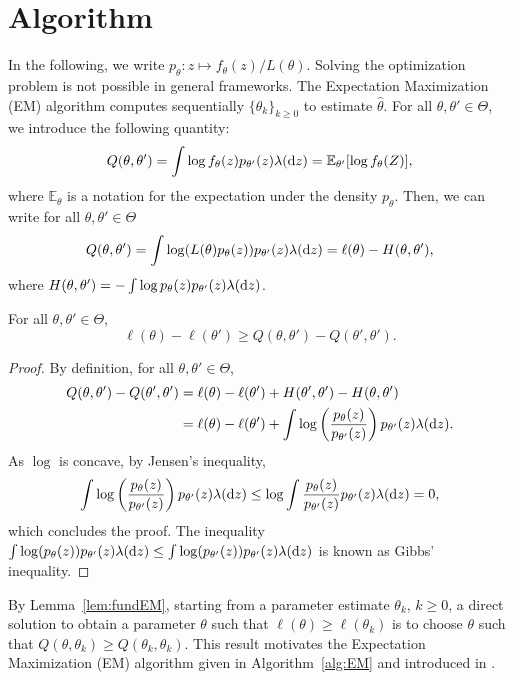 \documentclass[english,graybox,envcountchap,envcountsame,sectrefs,shortlabels]{svmono}
\theoremstyle{style}
\newcommand{\eqsp}{}
\begin{document}
\section{Algorithm}
In the following, we write $p_\theta:z\mapsto f_\theta(z)/L(\theta)$. Solving the optimization problem is not possible in general frameworks. The Expectation Maximization (EM) algorithm computes sequentially $\{\theta_k\}_{k\geq 0}$ to estimate $\widehat \theta$. For all $\theta,\theta'\in\Theta$, we introduce the following quantity:
$$
Q(\theta,\theta') = \int \log f_\theta(z)p_{\theta'}(z)\lambda(\rmd z) = \mathbb{E}_{\theta'}[\log f_\theta(Z)]\eqsp,
$$
where $\mathbb{E}_{\theta}$ is a notation for the expectation under the density $p_\theta$. Then, we can write for all $\theta,\theta'\in\Theta$
$$
Q(\theta,\theta') = \int \log (L(\theta)p_\theta(z))p_{\theta'}(z)\lambda(\rmd z) = \ell(\theta) - H(\theta,\theta')\eqsp,
$$
where $H(\theta,\theta') = - \int \log p_\theta(z) p_{\theta'}(z)\lambda(\mathrm{d} z)$.

\begin{lemma}
\label{lem:fundEM}
For all $\theta,\theta'\in\Theta$,
$$
\ell(\theta)-\ell(\theta')\geq Q(\theta,\theta')-Q(\theta',\theta')\eqsp.
$$
\end{lemma}
\begin{proof}
By definition, for all $\theta,\theta'\in\Theta$,
\begin{align*}
Q(\theta,\theta')-Q(\theta',\theta') &= \ell(\theta)-\ell(\theta') + H(\theta',\theta') - H(\theta,\theta')\\
&= \ell(\theta)-\ell(\theta') + \int \log\left(\frac{p_\theta(z)}{p_{\theta'}(z)}\right)p_{\theta'}(z)\lambda(\rmd z)\eqsp.
\end{align*}
As $\log$ is concave, by Jensen's inequality, 
$$
\int \log\left(\frac{p_\theta(z)}{p_{\theta'}(z)}\right)p_{\theta'}(z)\lambda(\rmd z) \leq \log\int \frac{p_\theta(z)}{p_{\theta'}(z)}p_{\theta'}(z)\lambda(\rmd z) = 0\eqsp,
$$
which concludes the proof. The inequality $\int \log(p_\theta(z))p_{\theta'}(z)\lambda(\mathrm{d} z) \leq \int \log(p_{\theta'}(z))p_{\theta'}(z)\lambda(\mathrm{d} z)$ is known as Gibbs' inequality.
\end{proof}
By Lemma~\ref{lem:fundEM}, starting from a parameter estimate $\theta_k$, $k\geq 0$, a direct solution to obtain a parameter $\theta$ such that $\ell(\theta) \geq \ell(\theta_k)$ is to choose $\theta$ such that $Q(\theta,\theta_k)\geq Q(\theta_k,\theta_k)$. This result motivates the Expectation Maximization (EM) algorithm given in Algorithm~\ref{alg:EM} and introduced in \cite{dempster1977maximum}.
\end{document}
